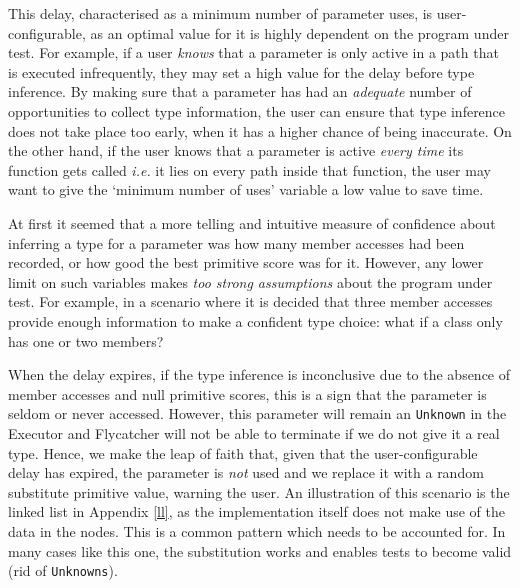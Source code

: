 This delay, characterised as a minimum number of parameter uses, is user-configurable, as an optimal value for it is highly dependent on the program under test. For example, if a user \emph{knows} that a parameter is only active in a path that is executed infrequently, they may set a high value for the delay before type inference. By making sure that a parameter has had an \emph{adequate} number of opportunities to collect type information, the user can ensure that type inference does not take place too early, when it has a higher chance of being inaccurate. On the other hand, if the user knows that a parameter is active \emph{every time} its function gets called \emph{i.e.} it lies on every path inside that function, the user may want to give the `minimum number of uses' variable a low value to save time.

At first it seemed that a more telling and intuitive measure of confidence about inferring a type for a parameter was how many member accesses had been recorded, or how good the best primitive score was for it. However, any lower limit on such variables makes \emph{too strong assumptions} about the program under test. For example, in a scenario where it is decided that three member accesses provide enough information to make a confident type choice: what if a class only has one or two members?


When the delay expires, if the type inference is inconclusive due to the absence of member accesses and null primitive scores, this is a sign that the parameter is seldom or never accessed. However, this parameter will remain an \texttt{Unknown} in the \textsf{Executor} and \textsf{Flycatcher} will not be able to terminate if we do not give it a real type. Hence, we make the leap of faith that, given that the user-configurable delay has expired, the parameter is \emph{not} used and we replace it with a random substitute primitive value, warning the user. An illustration of this scenario is the linked list in Appendix \ref{ll}, as the implementation itself does not make use of the data in the nodes. This is a common pattern which needs to be accounted for. In many cases like this one, the substitution works and enables tests to become valid (rid of \texttt{Unknowns}).


